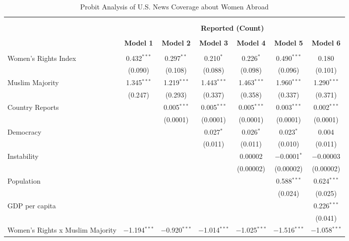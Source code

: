 
\begin{table}[!htbp] \centering 
  \caption{Probit Analysis of U.S. News Coverage about Women Abroad} 
  \label{table:negbin-part} 
\begin{tabular}{@{\extracolsep{5pt}}lcccccc} 
\\[-1.8ex]\hline \\[-1.8ex] 
\\[-1.8ex] & \multicolumn{6}{c}{\textbf{Reported (Count)}} \\ 
\\[-1.8ex] & \textbf{Model 1} & \textbf{Model 2} & \textbf{Model 3} & \textbf{Model 4} & \textbf{Model 5} & \textbf{Model 6}\\ 
\hline \\[-1.8ex] 
 Women's Rights Index & 0.432$^{***}$ & 0.297$^{**}$ & 0.210$^{*}$ & 0.226$^{*}$ & 0.490$^{***}$ & 0.180 \\ 
  & (0.090) & (0.108) & (0.088) & (0.098) & (0.096) & (0.101) \\ 
  Muslim Majority & 1.345$^{***}$ & 1.219$^{***}$ & 1.443$^{***}$ & 1.463$^{***}$ & 1.960$^{***}$ & 1.290$^{***}$ \\ 
  & (0.247) & (0.293) & (0.337) & (0.358) & (0.337) & (0.371) \\ 
  Country Reports &  & 0.005$^{***}$ & 0.005$^{***}$ & 0.005$^{***}$ & 0.003$^{***}$ & 0.002$^{***}$ \\ 
  &  & (0.0001) & (0.0001) & (0.0001) & (0.0001) & (0.0001) \\ 
  Democracy &  &  & 0.027$^{*}$ & 0.026$^{*}$ & 0.023$^{*}$ & 0.004 \\ 
  &  &  & (0.011) & (0.011) & (0.010) & (0.011) \\ 
  Instability &  &  &  & 0.00002 & $-$0.0001$^{*}$ & $-$0.00003 \\ 
  &  &  &  & (0.00002) & (0.00002) & (0.00002) \\ 
  Population &  &  &  &  & 0.588$^{***}$ & 0.624$^{***}$ \\ 
  &  &  &  &  & (0.024) & (0.025) \\ 
  GDP per capita &  &  &  &  &  & 0.226$^{***}$ \\ 
  &  &  &  &  &  & (0.041) \\ 
  Women's Rights x Muslim Majority & $-$1.194$^{***}$ & $-$0.920$^{***}$ & $-$1.014$^{***}$ & $-$1.025$^{***}$ & $-$1.516$^{***}$ & $-$1.058$^{***}$ \\ 

\end{tabular}
\end{table}

